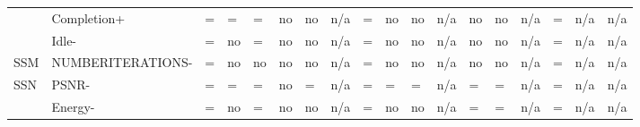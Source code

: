 \begin{tabular}{llllllllllllllllll}
        & Completion+       & = & = & = & no & no & n/a & 
                              = & no & no & n/a & 
                              no & no & n/a & 
                              = & n/a & 
                              n/a  \\
        & Idle-             & = & no & = & no & no & n/a & 
                              = & no & no & n/a & 
                              no & no & n/a & 
                              = & n/a & 
                              n/a  \\
  \hline
  SSM  & NUMBERITERATIONS- &  = & no & no & no & no & n/a & 
                              = & no & no & n/a & 
                              no & no & n/a & 
                              = & n/a & 
                              n/a  \\
  \hline
  SSN     & PSNR-       & = & = & = & no & = & n/a & 
                          = & = & = & n/a & 
                          = & = & n/a & 
                          = & n/a & 
                          n/a  \\
          & Energy-     & = & no & = & no & no & n/a & 
                          = & no & no & n/a & 
                          = & = & n/a & 
                          = & n/a & 
                          n/a  \\      
  \end{tabular}
